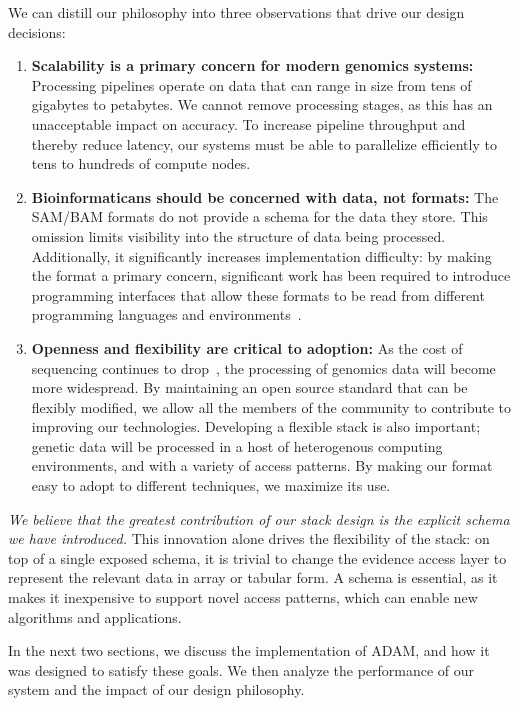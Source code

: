 \documentclass[10pt,twocolumn]{article}
\theoremstyle{plain}
\begin{document}
We can distill our philosophy into three observations that drive our design decisions:

\begin{enumerate}
\item {\bf Scalability is a primary concern for modern genomics systems:} Processing pipelines operate on data that can range in size from
tens of gigabytes to petabytes. We cannot remove processing stages, as this has an unacceptable impact on accuracy. To increase
pipeline throughput and thereby reduce latency, our systems must be able to parallelize efficiently to tens to hundreds of compute nodes.
\item {\bf Bioinformaticans should be concerned with data, not formats:} The SAM/BAM formats do not provide a schema for the data they
store. This omission limits visibility into the structure of data being processed. Additionally, it significantly increases implementation difficulty: by
making the format a primary concern, significant work has been required to introduce programming interfaces that allow these formats to
be read from different programming languages and environments~\cite{li09,picard,niemenmaa12}.
\item {\bf Openness and flexibility are critical to adoption:} As the cost of sequencing continues to drop~\cite{nhgri}, the processing of genomics
data will become more widespread. By maintaining an open source standard that can be flexibly modified, we allow all the members of the
community to contribute to improving our technologies. Developing a flexible stack is also important; genetic data will be processed in a host
of heterogenous computing environments, and with a variety of access patterns. By making our format easy to adopt to different techniques, we
maximize its use.
\end{enumerate}

\emph{We believe that the greatest contribution of
our stack design is the explicit schema we have introduced.} This innovation alone drives the flexibility of the stack: on top of a single exposed schema, it
is trivial to change the evidence access layer to represent the relevant data in array or tabular form. A schema is essential, as it makes it inexpensive
to support novel access patterns, which can enable new algorithms and applications.

In the next two sections, we discuss the implementation of ADAM, and how it was designed to satisfy these goals. We then
analyze the performance of our system and the impact of our design philosophy.
\end{document}
